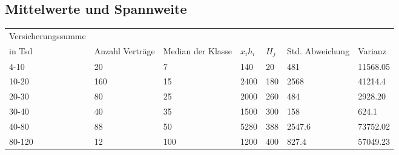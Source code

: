 \subsection{Mittelwerte und Spannweite}\label{praxis:mittelwerte}
\begin{table}[h]
\centering
\begin{tabular}{@{}lllllll@{}}
\toprule
Versicherungssumme\\ in Tsd & Anzahl Verträge & Median der Klasse & $x_ih_i$ & $H_j$ & Std. Abweichung & Varianz \\ \midrule
4-10 & 20 & 7 & 140 & 20 & 481 & 11568.05 \\
10-20 & 160 & 15 & 2400 & 180 & 2568 & 41214.4 \\
20-30 & 80 & 25 & 2000 & 260 & 484 & 2928.20 \\
30-40 & 40 & 35 & 1500 & 300 & 158 & 624.1 \\
40-80 & 88 & 50 & 5280 & 388 & 2547.6 & 73752.02 \\
80-120 & 12 & 100 & 1200 & 400 & 827.4 & 57049.23 \\ \bottomrule
\end{tabular}
\end{table}
